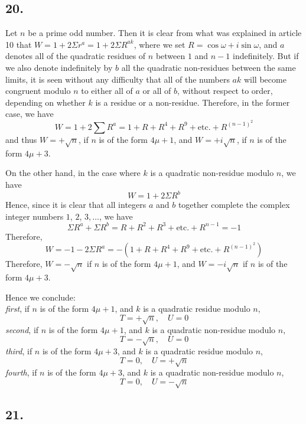 \documentclass[twoside,12pt]{memoir}
\begin{document}
\subsection*{20.}
 
Let \(n\) be a prime odd number.  Then it is clear from what was explained in article 10 that \(W=1+2 \Sigma r^{a}=1+2 \Sigma R^{a k}\), where we set \(R=\cos \omega+i \sin \omega\), and \(a\) denotes all of the quadratic residues of \(n\) between \(1\) and \(n-1\) indefinitely. But if we also denote indefinitely by \(b\) all the quadratic non-residues between the same limits, it is seen without any difficulty that all of the numbers \(a k\) will become congruent modulo \(n\) to either all of \(a\) or all of \(b\), without respect to order, depending on whether \(k\) is a residue or a non-residue. Therefore, in the former case, we have
\[W=1+2 \sum R^{a}=1+R+R^{4}+R^{9}+\text{etc{.}}+R^{(n-1)^{2}}\]
and thus \(W=+\sqrt{n}\), if \(n\) is of the form \(4 \mu+1\), and \(W=+i \sqrt{n}\), if \(n\) is of the form \(4 \mu+3\).
%

On the other hand, in the case where \(k\) is a quadratic non-residue modulo \(n\), we have
\[W=1+2 \Sigma R^{b}\]
Hence, since it is clear that all integers \(a\) and \(b\) together complete the complex integer numbers \(1\), \(2\), \(3, \ldots\), we have
\[\Sigma R^{a}+\Sigma R^{b}=R+R^{2}+R^{3}+\text{etc{.}}+R^{n-1}=-1\]
Therefore,
\[W=-1-2 \Sigma R^{a}=-(1+R+R^{4}+R^{9}+\text{etc{.}}+R^{(n-1)^{2}})\]
Therefore, \(W=-\sqrt{n}\) if \(n\) is of the form \(4\mu+1\), and \(W=-i\sqrt{n}\) if \(n\) is of the form \(4\mu+3\).
%

Hence we conclude:\\
\textit{first}, if \(n\) is of the form \(4\mu+1\), and \(k\) is a quadratic residue modulo \(n\),
\[T=+\sqrt{n}, \quad U=0\]
\textit{second}, if \(n\) is of the form \(4\mu+1\), and \(k\) is a quadratic non-residue modulo \(n\),
\[T=-\sqrt{n}, \quad U=0\]
\textit{third}, if \(n\) is of the form \(4\mu+3\), and \(k\) is a quadratic residue modulo \(n\),
\[T=0, \quad U=+\sqrt{n}\]
\textit{fourth}, if \(n\) is of the form \(4\mu+3\), and \(k\) is a quadratic non-residue modulo \(n\),
\[T=0, \quad U=-\sqrt{n}\]
%

\subsection*{21.}
\end{document}
